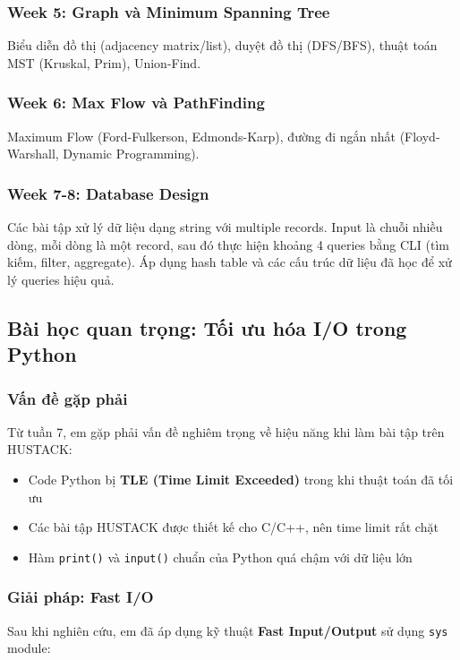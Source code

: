 \documentclass[12pt,a4paper]{article}
\begin{document}
\subsubsection{Week 5: Graph và Minimum Spanning Tree}
Biểu diễn đồ thị (adjacency matrix/list), duyệt đồ thị (DFS/BFS), thuật toán MST (Kruskal, Prim), Union-Find.

\subsubsection{Week 6: Max Flow và PathFinding}
Maximum Flow (Ford-Fulkerson, Edmonds-Karp), đường đi ngắn nhất (Floyd-Warshall, Dynamic Programming).

\subsubsection{Week 7-8: Database Design}
Các bài tập xử lý dữ liệu dạng string với multiple records. Input là chuỗi nhiều dòng, mỗi dòng là một record, sau đó thực hiện khoảng 4 queries bằng CLI (tìm kiếm, filter, aggregate). Áp dụng hash table và các cấu trúc dữ liệu đã học để xử lý queries hiệu quả.

\subsection{Bài học quan trọng: Tối ưu hóa I/O trong Python}

\subsubsection{Vấn đề gặp phải}
Từ tuần 7, em gặp phải vấn đề nghiêm trọng về hiệu năng khi làm bài tập trên HUSTACK:
\begin{itemize}
    \item Code Python bị \textbf{TLE (Time Limit Exceeded)} trong khi thuật toán đã tối ưu
    \item Các bài tập HUSTACK được thiết kế cho C/C++, nên time limit rất chặt
    \item Hàm \texttt{print()} và \texttt{input()} chuẩn của Python quá chậm với dữ liệu lớn
\end{itemize}

\subsubsection{Giải pháp: Fast I/O}
Sau khi nghiên cứu, em đã áp dụng kỹ thuật \textbf{Fast Input/Output} sử dụng \texttt{sys} module:
\end{document}
